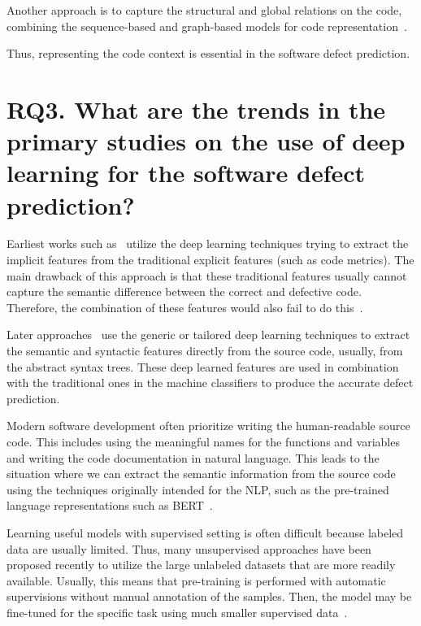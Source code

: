 \documentclass[mathematics,review,submit,moreauthors,pdftex]{Definitions/mdpi}
\begin{document}
 Another approach is to capture the structural and global relations on the code, combining the sequence-based and graph-based models for code representation~\cite{hellendoorn2020global,guo2021graphcodebert}. 

Thus, representing the code context is essential in the software defect prediction. 

\section{RQ3. What are the trends in the primary studies on the use of deep learning for the software defect prediction?} \label{sec_5}

Earliest works such as~\cite{YangEtAl2015} utilize the deep learning techniques trying to extract the implicit features from the traditional explicit features (such as code metrics).
The main drawback of this approach is that these traditional features usually cannot capture the semantic difference between the correct and defective code. Therefore, the combination of these features would also fail to do this~\cite{LiEtAl2017}.

Later approaches~\cite{DamEtAl2019,HoangEtAl2019} use the generic or tailored deep learning techniques to extract the semantic and syntactic features directly from the source code, usually, from the abstract syntax trees. These deep learned features are used in combination with the traditional ones in the machine classifiers to produce the accurate defect prediction.

Modern software development often prioritize writing the human-readable source code. This includes using the  meaningful names for the functions and variables and writing the code documentation in natural language. This leads to the situation where we can extract the semantic information from the source code using the techniques originally intended for the NLP, such as the pre-trained language representations such as BERT~\cite{devlin2019bert}. 

Learning useful models with supervised setting is often difficult because labeled data are usually limited. Thus, many unsupervised approaches have been proposed recently to utilize the large unlabeled datasets that are more readily available. Usually, this means that pre-training is performed with automatic supervisions without manual annotation of the samples. Then, the model may be fine-tuned for the specific task using much smaller supervised data~\cite{kanade20cubert}.
\end{document}
